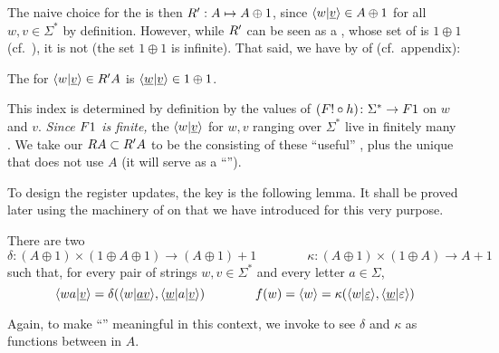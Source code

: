 The naive choice for the  is then $\functorr' : A \mapsto A
\oplus 1$, since $\langle w|\underline{v} \rangle \in A\oplus1$ for all $w,v\in\Sigma^*$
by definition. However, while $\functorr'$ can be seen as a , whose set of  is $1 \oplus 1$ (cf.~), it is not  (the set $1\oplus1$ is infinite). That said, we have by  of  (cf.~appendix):
\begin{claim}\label{clm:component-index}
  The  for $\tuple{w|\underline{v}} \in \functorr'A$ is $\langle \underline{w}|\underline{v} \rangle \in 1 \oplus 1$.
\end{claim}
This index is determined by definition by the values of $(\functor! \circ h) \colon \Sigma^* \to \functor1$ on $w$ and $v$. \emph{Since $\functor1$ is finite,} the $\langle w|\underline{v} \rangle$ for $w,v$ ranging over $\Sigma^*$ live in finitely many . We take our   $\functorr A \subset \functorr' A$ to be the  consisting of these \enquote{useful} , plus the unique  that does not use $A$ (it will serve as a \enquote{}).

To design the register updates, the key is the following lemma. It shall be proved later using the machinery of  on  that we have introduced for this very purpose.
\begin{lemma}\label{lem:compute-next-configuration}
  There are two 
  \[
    \delta\colon (A \oplus 1) \times (1 \oplus A \oplus 1) \to (A \oplus 1) + 1
    \qquad\qquad
    \kappa\colon (A \oplus 1) \times (1 \oplus A) \to A + 1
  \]
  such that, for every pair of strings $w,v \in \Sigma^*$ and every letter $a
  \in \Sigma$,
  \[ \langle wa|\underline v \rangle = \delta(\langle w|\underline
      {av} \rangle,\langle \underline w | a|\underline v \rangle) \qquad\qquad f(w) = \langle w \rangle =
    \kappa(\langle w|\underline\varepsilon \rangle,\langle \underline w | \varepsilon \rangle) \]
\end{lemma}
Again, to make \enquote{} meaningful in this context, we invoke
 to see $\delta$ and $\kappa$ as
functions between  in $A$.

